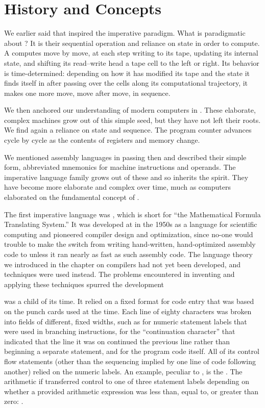 \label{imperative:defining}
\section{History and Concepts}%
We earlier said that \TMs inspired the imperative paradigm. What is paradigmatic about \TMs{}? It is their sequential operation and reliance on state in order to compute. A \TM computes move by move, at each step writing to its tape, updating its internal state, and shifting its read--write head a tape cell to the left or right. Its behavior is time-determined: depending on how it has modified its tape and the state it finds itself in after passing over the cells along its computational trajectory, it makes one more move, move after move, in sequence.

We then anchored our understanding of modern computers in \TMs{}. These elaborate, complex machines grow out of this simple seed, but they have not left their roots. We find again a reliance on state and sequence. The program counter advances cycle by cycle as the contents of registers and memory change.

We mentioned assembly languages in passing then and described their simple form, abbreviated mnemonics for machine instructions and operands. The imperative language family grows out of these and so inherits the \TM spirit. They have become more elaborate and complex over time, much as computers elaborated on the fundamental concept of \TMs{}.

The first imperative language was \vocab{\Fortran}{}, which is short for ``the  Mathematical Formula Translating System.'' It was developed at  in the 1950s as a language for scientific computing and pioneered compiler design and optimization, since no-one would trouble to make the switch from writing hand-written, hand-optimized assembly code to \Fortran unless it ran nearly as fast as such assembly code. The language theory we introduced in the chapter on compilers had not yet been developed, and  techniques were used instead. The problems encountered in inventing and applying these techniques spurred the development

\Fortran was a child of its time. It relied on a fixed format for code entry that was based on the punch cards used at the time. Each line of eighty characters was broken into fields of different, fixed widths, such as for numeric statement labels that were used in branching instructions, for the ``continuation character'' that indicated that the line it was on continued the previous line rather than beginning a separate statement, and for the program code itself. All of its control flow statements (other than the sequencing implied by one line of code following another) relied on the numeric labels. An example, peculiar to \Fortran{}, is the . The arithmetic if transferred control to one of three statement labels depending on whether a provided arithmetic expression was less than, equal to, or greater than zero:     .

